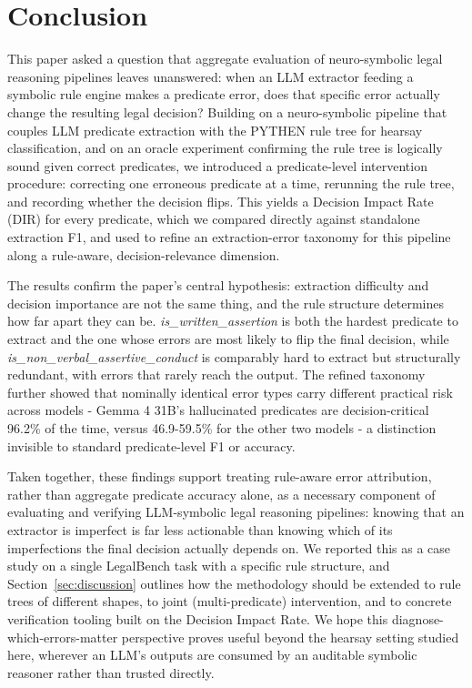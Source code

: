 \section{Conclusion}
\label{sec:conclusion}

This paper asked a question that aggregate evaluation of neuro-symbolic legal reasoning pipelines leaves unanswered: when an LLM extractor feeding a symbolic rule engine makes a predicate error, does that specific error actually change the resulting legal decision? Building on a neuro-symbolic pipeline that couples LLM predicate extraction with the PYTHEN rule tree for hearsay classification, and on an oracle experiment confirming the rule tree is logically sound given correct predicates, we introduced a predicate-level intervention procedure: correcting one erroneous predicate at a time, rerunning the rule tree, and recording whether the decision flips. This yields a Decision Impact Rate (DIR) for every predicate, which we compared directly against standalone extraction F1, and used to refine an extraction-error taxonomy for this pipeline along a rule-aware, decision-relevance dimension.

The results confirm the paper's central hypothesis: extraction difficulty and decision importance are not the same thing, and the rule structure determines how far apart they can be. \textit{is\_written\_assertion} is both the hardest predicate to extract and the one whose errors are most likely to flip the final decision, while \textit{is\_non\_verbal\_assertive\_conduct} is comparably hard to extract but structurally redundant, with errors that rarely reach the output. The refined taxonomy further showed that nominally identical error types carry different practical risk across models - Gemma 4 31B's hallucinated predicates are decision-critical 96.2\% of the time, versus 46.9-59.5\% for the other two models - a distinction invisible to standard predicate-level F1 or accuracy.

Taken together, these findings support treating rule-aware error attribution, rather than aggregate predicate accuracy alone, as a necessary component of evaluating and verifying LLM-symbolic legal reasoning pipelines: knowing that an extractor is imperfect is far less actionable than knowing which of its imperfections the final decision actually depends on. We reported this as a case study on a single LegalBench task with a specific rule structure, and Section~\ref{sec:discussion} outlines how the methodology should be extended to rule trees of different shapes, to joint (multi-predicate) intervention, and to concrete verification tooling built on the Decision Impact Rate. We hope this diagnose-which-errors-matter perspective proves useful beyond the hearsay setting studied here, wherever an LLM's outputs are consumed by an auditable symbolic reasoner rather than trusted directly.
